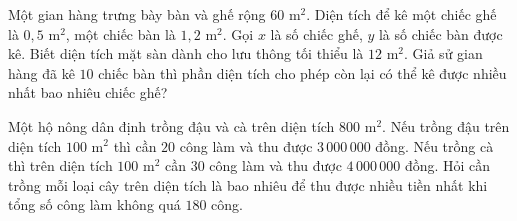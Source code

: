 \begin{bt}%
	Một gian hàng trưng bày bàn và ghế rộng $60$ m$^2$. Diện tích để kê một chiếc ghế là $0{,}5$ m$^2$, một chiếc bàn là $1{,}2$ m$^2$. Gọi $x$ là số chiếc ghế, $y$ là số chiếc bàn được kê. Biết diện tích mặt sàn dành cho lưu thông tối thiểu là $12$ m$^2$. Giả sử gian hàng đã kê $10$ chiếc  bàn thì phần diện tích cho phép còn lại có thể kê được nhiều nhất bao nhiêu chiếc ghế?\\
\end{bt}

\begin{bt}%
	Một hộ nông dân định trồng đậu và cà trên diện tích $800$ m$^2$. Nếu trồng đậu trên diện tích $100$ m$^2$ thì cần $20$ công làm và thu được $3\,000\,000$  đồng. Nếu trồng cà thì trên diện tích $100$ m$^2$ cần 3$ 0$ công làm và thu được $4\,000\,000$ đồng. Hỏi cần trồng mỗi loại cây trên diện tích là bao nhiêu để thu được nhiều tiền nhất khi tổng số công làm không quá $180$ công.
\end{bt}

